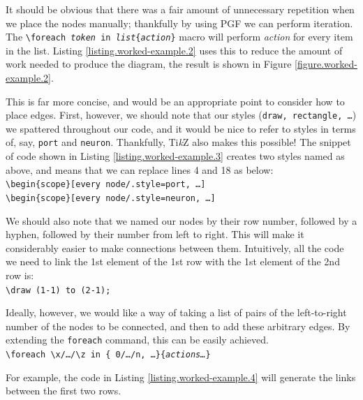 It should be obvious that there was a fair amount of unnecessary repetition when we place the nodes manually; thankfully by using PGF we can perform iteration.
The \texttt{\textbackslash foreach \textit{token} in \textit{list}\{\textit{action}\}} macro will perform \textit{action} for every item in the list.
Listing \ref{listing.worked-example.2} uses this to reduce the amount of work needed to produce the diagram, the result is shown in Figure \ref{figure.worked-example.2}.



This is far more concise, and would be an appropriate point to consider how to place edges.
First, however, we should note that our styles (\texttt{draw, rectangle, \ldots}) we spattered throughout our code, and it would be nice to refer to styles in terms of, say, \texttt{port} and \texttt{neuron}.
Thankfully, Ti\emph{k}Z also makes this possible!
The snippet of code shown in Listing \ref{listing.worked-example.3} creates two styles named as above, and means that we can replace lines 4 and 18 as below:\\
\texttt{\textbackslash begin\{scope\}[every node/.style=port, \ldots]}\\
\texttt{\textbackslash begin\{scope\}[every node/.style=neuron, \ldots]}



We should also note that we named our nodes by their row number, followed by a hyphen, followed by their number from left to right.
This will make it considerably easier to make connections between them.
Intuitively, all the code we need to link the 1st element of the 1st row with the 1st element of the 2nd row is:\\
\texttt{\textbackslash draw (1-1) to (2-1);}

Ideally, however, we would like a way of taking a list of pairs of the left-to-right number of the nodes to be connected, and then to add these arbitrary edges.
By extending the \texttt{foreach} command, this can be easily achieved.\\
\texttt{\textbackslash foreach \textbackslash x/\ldots/\textbackslash z in \{ 0/\ldots/n, \ldots \}\{\textit{actions\ldots}\}}

For example, the code in Listing \ref{listing.worked-example.4} will generate the links between the first two rows.

